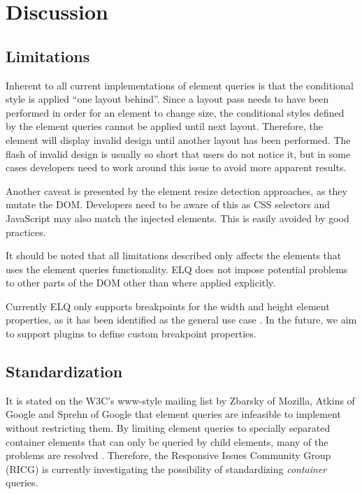 \documentclass{acm_proc_article-sp}
\newcommand{\elq}{ELQ}
\begin{document}
\section{Discussion}\label{sec:discussion}

  \subsection{Limitations}
    Inherent to all current implementations of element queries is that the conditional style is applied ``one layout behind''.
    Since a layout pass needs to have been performed in order for an element to change size, the conditional styles defined by the element queries cannot be applied until next layout.
    Therefore, the element will display invalid design until another layout has been performed.
    The flash of invalid design is usually so short that users do not notice it, but in some cases developers need to work around this issue to avoid more apparent results.

    Another caveat is presented by the element resize detection approaches, as they mutate the DOM.
    Developers need to be aware of this as CSS selectors and JavaScript may also match the injected elements.
    This is easily avoided by good practices.

    It should be noted that all limitations described only affects the elements that uses the element queries functionality.
    \elq{} does not impose potential problems to other parts of the DOM other than where applied explicitly.

    Currently \elq{} only supports breakpoints for the width and height element properties, as it has been identified as the general use case \cite{elq-thesis}.
    In the future, we aim to support plugins to define custom breakpoint properties.

  \subsection{Standardization}
    It is stated on the W3C's www-style mailing list \cite{w3c_eq_mail} by Zbarsky of Mozilla, Atkins of Google and Sprehn of Google that element queries are infeasible to implement without restricting them.
    By limiting element queries to specially separated container elements that can only be queried by child elements, many of the problems are resolved \cite{ricg_irc_log,ricg_issue_viewport}.
    Therefore, the Responsive Issues Community Group (RICG) is currently investigating the possibility of standardizing \emph{container} queries.
\end{document}
